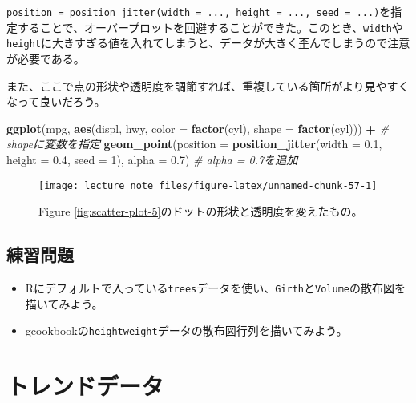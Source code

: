 \documentclass[]{book}
\newenvironment{Shaded}{\begin{snugshade}}{\end{snugshade}}
\newcommand{\KeywordTok}[1]{\textcolor[rgb]{0.13,0.29,0.53}{\textbf{#1}}}
\newcommand{\DataTypeTok}[1]{\textcolor[rgb]{0.13,0.29,0.53}{#1}}
\newcommand{\DecValTok}[1]{\textcolor[rgb]{0.00,0.00,0.81}{#1}}
\newcommand{\FloatTok}[1]{\textcolor[rgb]{0.00,0.00,0.81}{#1}}
\newcommand{\StringTok}[1]{\textcolor[rgb]{0.31,0.60,0.02}{#1}}
\newcommand{\CommentTok}[1]{\textcolor[rgb]{0.56,0.35,0.01}{\textit{#1}}}
\newcommand{\OperatorTok}[1]{\textcolor[rgb]{0.81,0.36,0.00}{\textbf{#1}}}
\newcommand{\NormalTok}[1]{#1}
\begin{document}
\texttt{position\ =\ position\_jitter(width\ =\ ...,\ height\ =\ ...,\ seed\ =\ ...)}を指定することで、オーバープロットを回避することができた。このとき、\texttt{width}や\texttt{height}に大きすぎる値を入れてしまうと、データが大きく歪んでしまうので注意が必要である。

また、ここで点の形状や透明度を調節すれば、重複している箇所がより見やすくなって良いだろう。




\begin{Shaded}
\begin{Highlighting}[]
\KeywordTok{ggplot}\NormalTok{(mpg, }\KeywordTok{aes}\NormalTok{(displ, hwy, }\DataTypeTok{color =} \KeywordTok{factor}\NormalTok{(cyl), }\DataTypeTok{shape =} \KeywordTok{factor}\NormalTok{(cyl))) }\OperatorTok{+}\StringTok{ }\CommentTok{# shapeに変数を指定}
\StringTok{  }\KeywordTok{geom_point}\NormalTok{(}\DataTypeTok{position =} \KeywordTok{position_jitter}\NormalTok{(}\DataTypeTok{width =} \FloatTok{0.1}\NormalTok{, }\DataTypeTok{height =} \FloatTok{0.4}\NormalTok{, }\DataTypeTok{seed =} \DecValTok{1}\NormalTok{), }\DataTypeTok{alpha =} \FloatTok{0.7}\NormalTok{) }\CommentTok{# alpha = 0.7を追加}
\end{Highlighting}
\end{Shaded}

\begin{figure}

{\centering \texttt{[image: lecture\_note\_files/figure-latex/unnamed-chunk-57-1]} 

}

\caption{Figure
\ref{fig:scatter-plot-5}のドットの形状と透明度を変えたもの。}\label{fig:unnamed-chunk-57}
\end{figure}

\section{練習問題}\label{-2}

\begin{itemize}
\item
  Rにデフォルトで入っている\texttt{trees}データを使い、\texttt{Girth}と\texttt{Volume}の散布図を描いてみよう。
\item
  gcookbookの\texttt{heightweight}データの散布図行列を描いてみよう。
\end{itemize}

\chapter{トレンドデータ}\label{trend-data}
\end{document}
